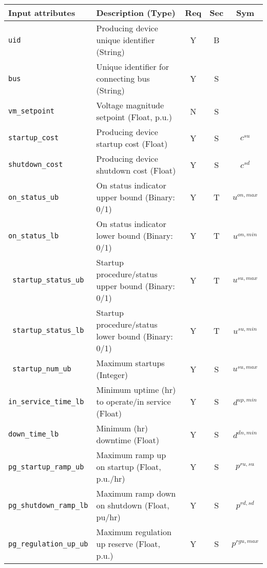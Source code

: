 \documentclass{article}
\begin{document}
\begin{center}
\small
\begin{tabular}{ l | l | c | c | c |}
Input attributes & Description (Type) & Req & Sec & Sym\\
\hline
  {\tt uid} & Producing device unique identifier (String) & Y & B &  \\
  {\tt bus} & Unique identifier for connecting bus (String)& Y & S & \\
  {\tt vm\_setpoint} & Voltage magnitude setpoint (Float, p.u.) & N & S & \\
  {\tt startup\_cost} & Producing device startup cost (Float) & Y & S & $c^{su}$\\
  {\tt shutdown\_cost} & Producing device shutdown cost (Float) & Y & S & $c^{sd}$\\  
  {\tt on\_status\_ub} & On status indicator upper bound (Binary: 0/1) & Y & T & $u^{on,max}$\\
  {\tt on\_status\_lb} & On status indicator lower bound (Binary: 0/1) & Y & T & $u^{on,min}$\\
  {\tt\color{red} startup\_status\_ub} & Startup procedure/status upper bound (Binary: 0/1) & Y & T & $u^{su,max}$\\
  {\tt\color{red} startup\_status\_lb} & Startup procedure/status lower bound (Binary: 0/1) & Y & T & $u^{su,min}$\\
  {\tt\color{red} startup\_num\_ub} & Maximum startups (Integer) & Y & S & $u^{su,max}$\\  
  {\tt in\_service\_time\_lb} & Minimum uptime (hr) to operate/in service (Float) & Y & S & $d^{up,min}$\\
  {\tt down\_time\_lb} & Minimum (hr) downtime (Float) & Y & S & $d^{dn,min}$\\
  {\tt pg\_startup\_ramp\_ub} & Maximum ramp up on startup (Float, p.u./hr) & Y & S & $p^{ru,su}$\\
  {\tt pg\_shutdown\_ramp\_lb}   & Maximum ramp down on shutdown (Float, pu/hr) & Y & S & $p^{rd,sd}$\\
  {\tt pg\_regulation\_up\_ub} & Maximum regulation up reserve (Float, p.u.) & Y & S & $p^{rgu,max}$\\ 

\end{tabular}
\end{center}
\end{document}
